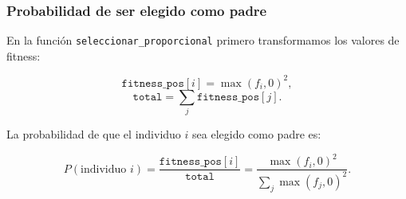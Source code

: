 \documentclass[
	11pt, %
]{beamer}
\begin{document}
\begin{frame}
\frametitle{Probabilidad de ser elegido como padre}


    En la función \texttt{seleccionar\_proporcional} primero transformamos
    los valores de fitness:

    \[
      \texttt{fitness\_pos}[i] = \max(f_i, 0)^2,
    \]
    \[
      \texttt{total} = \sum_j \texttt{fitness\_pos}[j].
    \]

    \vspace{0.3cm}

    La probabilidad de que el individuo $i$ sea elegido como padre es:

    \[
      P(\text{individuo } i) =
      \frac{\texttt{fitness\_pos}[i]}{\texttt{total}} =
      \frac{\max(f_i, 0)^2}{\sum_j \max(f_j, 0)^2}.
    \]




\end{frame}
\end{document}
